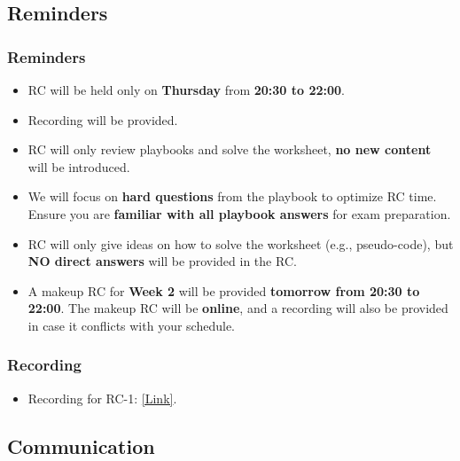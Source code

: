 \documentclass[
	11pt, %
]{beamer}
\begin{document}

\subsection{Reminders}

\begin{frame}
	\frametitle{Reminders}
 
	\begin{itemize}
    \item RC will be held only on \textbf{Thursday} from \textbf{20:30 to 22:00}.
    \item Recording will be provided.
    \item RC will only review playbooks and solve the worksheet, \textbf{no new content} will be introduced.
    \item We will focus on \textbf{hard questions} from the playbook to optimize RC time. Ensure you are \textbf{familiar with all playbook answers} for exam preparation.
    \item RC will only give ideas on how to solve the worksheet (e.g., pseudo-code), but \textbf{NO direct answers} will be provided in the RC.
    \item A makeup RC for \textbf{Week 2} will be provided \textbf{tomorrow from 20:30 to 22:00}. The makeup RC will be \textbf{online}, and a recording will also be provided in case it conflicts with your schedule.
\end{itemize}

\end{frame}



\begin{frame}
	\frametitle{Recording}
 
	\begin{itemize}
    \item Recording for RC-1: \href{https://sjtu.feishu.cn/minutes/obcn81s8v371bg9k42p1228p?from_source=finish_recording}{[Link]}.
\end{itemize}

\end{frame}



\subsection{Communication}
\end{document}
